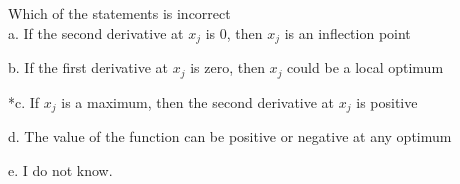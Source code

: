 
Which of the statements is incorrect\\

a. If the second derivative at \( x_{j} \) is \( 0 \), then \( x_{j} \) is an inflection point

b. If the first derivative at \( x_{j} \) is zero, then \( x_{j} \) could be a local optimum

*c. If \( x_{j} \) is a maximum, then the second derivative at \( x_{j} \) is positive

d. The value of the function can be positive or negative at any optimum

e. I do not know.\\
